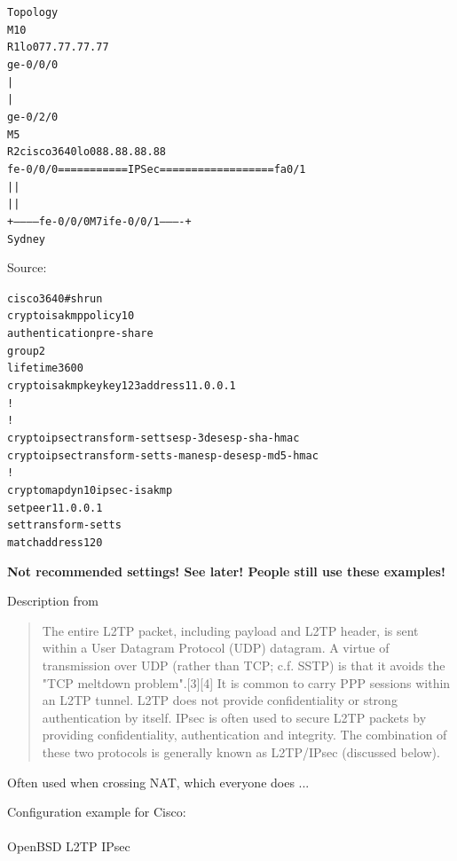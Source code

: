 \documentclass[Screen16to9,17pt]{foils}
\begin{document}

\begin{alltt}\small
Topology
  M10
  R1      lo0 77.77.77.77
ge-0/0/0
   |
   |
ge-0/2/0
  M5
  R2                                         cisco3640  lo0 88.88.88.88
fe-0/0/0  ===========IPSec==================    fa0/1
   |                                              |
   |                                              |
   +----------- fe-0/0/0  M7i  fe-0/0/1 ----------+
                        Sydney
\end{alltt}

Source:


\begin{alltt}\small
cisco3640#sh run
crypto isakmp policy 10
 authentication pre-share
 group 2
 lifetime 3600
crypto isakmp key key123 address 11.0.0.1
!
!
crypto ipsec transform-set ts esp-3des esp-sha-hmac
crypto ipsec transform-set ts-man esp-des esp-md5-hmac
!
crypto map dyn 10 ipsec-isakmp
 set peer 11.0.0.1
 set transform-set ts
 match address 120
\end{alltt}

\vskip 1cm
\centerline{\bf Not recommended settings! See later! People still use these examples! {\myalert}}



Description from
\begin{quote}\small
The entire L2TP packet, including payload and L2TP header, is sent within a User Datagram Protocol (UDP) datagram. A virtue of transmission over UDP (rather than TCP; c.f. SSTP) is that it avoids the "TCP meltdown problem".[3][4] It is common to carry PPP sessions within an L2TP tunnel. L2TP does not provide confidentiality or strong authentication by itself. IPsec is often used to secure L2TP packets by providing confidentiality, authentication and integrity. The combination of these two protocols is generally known as L2TP/IPsec (discussed below).
\end{quote}


Often used when crossing NAT, which everyone does ...

Configuration example for Cisco:\\
{\small {}}\\
OpenBSD L2TP IPsec\\
{\small{}}
\end{document}
